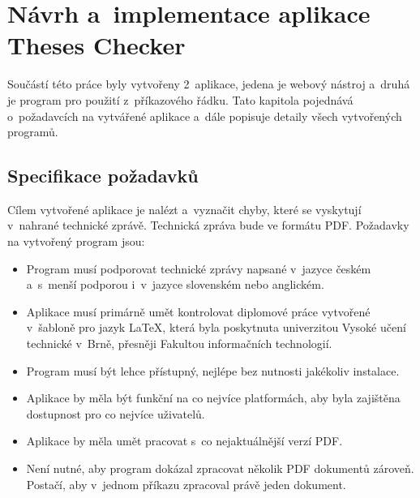



\chapter{Návrh a~implementace aplikace Theses Checker} \label{design_implementation}
Součástí této práce byly vytvořeny 2~aplikace, jedena je webový nástroj a~druhá je
program pro použití z~příkazového řádku. Tato kapitola pojednává o~požadavcích na 
vytvářené aplikace a~dále popisuje detaily všech vytvořených programů.


\section{Specifikace požadavků}
Cílem vytvořené aplikace je nalézt a~vyznačit chyby, které se vyskytují
v~nahrané technické zprávě. Technická zpráva bude ve formátu PDF.
Požadavky na vytvořený program jsou:
\begin{itemize}
    \item Program musí podporovat technické zprávy napsané v~jazyce českém
    a~s~menší podporou i~v~jazyce slovenském nebo anglickém.

    \item Aplikace musí primárně umět kontrolovat diplomové práce vytvořené
    v~šabloně pro jazyk {\LaTeX}, která byla
    poskytnuta univerzitou Vysoké učení technické v~Brně, přesněji Fakultou
    informačních technologií.

    \item Program musí být lehce přístupný, nejlépe bez nutnosti
    jakékoliv instalace.
    
    \item Aplikace by měla být funkční na co nejvíce platformách, aby byla
    zajištěna dostupnost pro co nejvíce uživatelů.

    \item Aplikace by měla umět pracovat s~co nejaktuálnější verzí PDF.
    
    \item Není nutné, aby program dokázal zpracovat několik PDF dokumentů
    zároveň. Postačí, aby v~jednom příkazu zpracoval právě jeden dokument.
\end{itemize}

